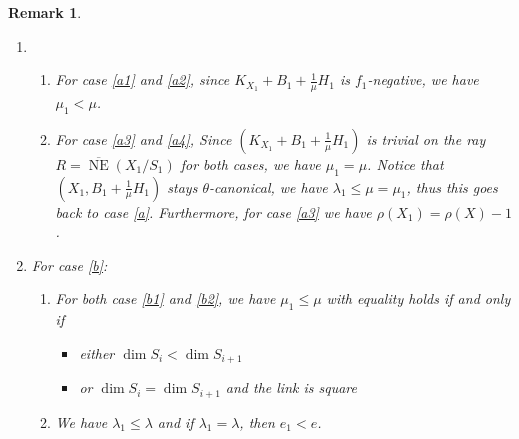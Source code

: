 \documentclass{article}
\newtheorem{rmk}[defn]{Remark}
\begin{document}
\begin{rmk}
  
\begin{enumerate}[A]
  \item 
  \begin{enumerate}[1]
    \item For case \ref{a1} and \ref{a2},  since $ K_{X_1}+B_1+\frac{1}{\mu}H_1 $ is $ f_1 $-negative, we have    $\mu_1<\mu$.
    \item For case \ref{a3} and \ref{a4}, Since $ (K_{X_1}+B_1+\frac{1}{\mu}H_1) $ is trivial on the ray $ R=\overline{\operatorname{NE}}(X_1/S_1) $ for both cases, we have $\mu_1=\mu$.
      Notice that $ (X_1,B_1+\frac{1}{\mu}H_1) $ stays $ \theta $-canonical, we have $\lambda_1\leqslant \mu=\mu_1$, thus this goes back to case \ref{a}. Furthermore,   for case \ref{a3} we have $\rho(X_1)=\rho(X)-1$.
  \end{enumerate} 
\item For case \ref{b}: 
  \begin{enumerate}[1]
    \item For both case \ref{b1} and \ref{b2}, we have   $\mu_1\leqslant \mu$
    with equality holds if and only if 
    \begin{itemize}
      \item 
        either $\dim S_i<\dim S_{i+1} $
        \item  
        or $\dim S_i=\dim S_{i+1}$ and the link is square 
    \end{itemize}
  \item We have  $\lambda_1\leqslant \lambda$ and if $ \lambda_1=\lambda $, then   $e_1<e$.
  \end{enumerate} 
\end{enumerate}
\end{rmk}
\end{document}

